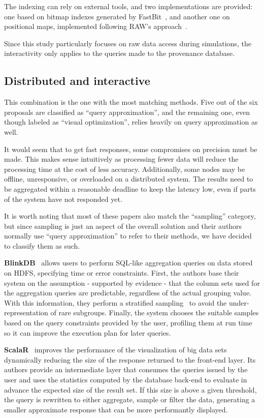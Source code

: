 The indexing can rely on external tools, and two implementations are provided:
one based on bitmap indexes generated by FastBit~\cite{Wu2009},
and another one on positional maps, implemented following RAW's 
approach~\cite{Karpathiotakis2014}.

Since this study particularly focuses on raw data access during simulations, the 
interactivity only applies to the queries made to the provenance database. 

\subsection{Distributed and interactive}
This combination is the one with the most matching methods. Five 
out of the six proposals are classified as ``query approximation'', and the 
remaining one, even though labeled as ``visual optimization'',
relies heavily on query approximation as well.

It would seem that to get fast responses, some compromises on precision 
must be made. This makes sense intuitively as processing fewer 
data will reduce the processing time at the cost of less accuracy. 
Additionally, some nodes may be offline, 
unresponsive, or overloaded on a distributed system. The results 
need to be aggregated within a reasonable deadline to keep the latency low, even if parts of the system 
have not responded yet.

It is worth noting that most of these papers also match the ``sampling''
category, but since sampling is just an aspect of the overall solution and their 
authors normally use ``query approximation'' to refer to their methods, we have 
decided to classify them as such.

\medskip

\textbf{BlinkDB}~\cite{Agarwal2013} allows users to perform SQL-like aggregation 
queries on data stored on HDFS, specifying time or error constraints. First, 
the authors base their system on the assumption - supported by evidence - that 
the column sets used for the aggregation queries are predictable, regardless of 
the actual grouping value. With this information, they perform a stratified 
sampling~\cite{Lohr2009} to avoid the under-representation of rare subgroups. 
Finally, the system chooses the suitable samples based on the query constraints 
provided by the user, profiling them at run time so it can improve the 
execution plan for later queries.

\medskip

\textbf{ScalaR}~\cite{Battle2013} improves the performance of the visualization 
of big data sets dynamically reducing the size of the response returned to the 
front-end layer. Its authors provide an intermediate layer that consumes the 
queries issued by the user and uses the statistics computed by the database 
back-end to evaluate in advance the expected size of the result set. If this 
size is above a given threshold, the query is rewritten to either aggregate, 
sample or filter the data, generating a smaller approximate response that can be 
more performantly displayed.

